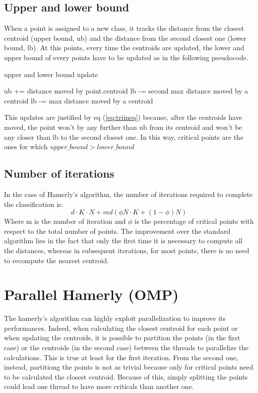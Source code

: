 \documentclass[conference]{IEEEtran}
\begin{document}
\subsection{Upper and lower bound}
When a point is assigned to a new class, it tracks the distance from the closest centroid (upper bound, ub) and the distance from the second closest one (lower bound, lb). At this points, every time the centroids are updated, the lower and upper bound of every points have to be updated as in the following pseudocode.

\begin{algorithm}[H]
    \caption{upper and lower bound update}
    \begin{algorithmic}
    \State ub += distance moved by point.centroid
        \State lb -= second max distance moved by a centroid
    \Else
        \State lb -= max distance moved by a centroid
    \EndIf
    \end{algorithmic}
\end{algorithm}

This updates are justified by eq (\ref{eq:triineq}) because, after the centroids have moved, the point won't by any further than ub from its centroid and won't be any closer than lb to the second closest one. In this way, critical points are the ones for which $upper\_bound > lower\_bound$

\subsection{Number of iterations}
In the case of Hamerly's algorithm, the number of iterations required to complete the classification is:
\begin{equation}
    d\cdot K\cdot N + md(\phi N\cdot K + (1 - \phi)N)
    \label{eq:hamcomp}
\end{equation}
Where m is the number of iteration and $\phi$ is the percentage of critical points with respect to the total number of points.
The improvement over the standard algorithm lies in the fact that only the first time it is necessary to compute all the distances, whereas in subsequent iterations, for most points, there is no need to recompute the nearest centroid.

\section{Parallel Hamerly (OMP)}
The hamerly's algorithm can highly exploit parallelization to improve its performances. Indeed, when calculating the closest centroid for each point or when updating the centroids, it is possible to partition the points (in the first case) or the centroids (in the second case) between the threads to parallelize the calculations.
This is true at least for the first iteration. From the second one, instead, partitiong the points is not as trivial because only for critical points need to be calculated the closest centroid. Because of this, simply splitting the points could lead one thread to have more criticals than another one.
\end{document}
